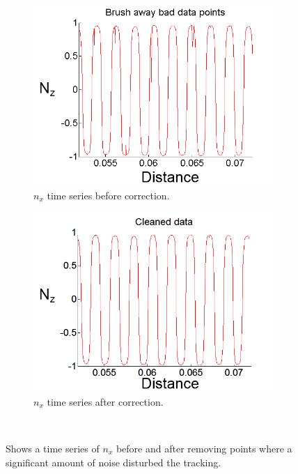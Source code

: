 \begin{figure}[H]
\centering
\begin{subfigure}[3a]{0.40\textwidth}
\includegraphics[width=\textwidth]{figures/method/Brushing1.png}
\caption{$n_x$ time series before correction.}\label{fig:prebrush}
\end{subfigure}\hspace{1em}%
\begin{subfigure}[3b]{0.40\textwidth}
\includegraphics[width=\textwidth]{figures/method/Brushing2.png}
\caption{$n_x$ time series after correction.}\label{fig:postbrush}
\end{subfigure} \\
\caption{Shows a time series of $n_x$ before and after removing points where a significant amount of noise disturbed the tracking. } \label{fig:brushed}
\end{figure}
